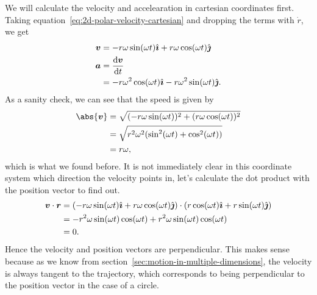 \documentclass[../classical_mechanics.tex]{subfiles}
\begin{document}
            We will calculate the velocity and accelearation in cartesian coordinates first.
            Taking equation~\ref{eq:2d-polar-velocity-cartesian} and dropping the terms with $\dot{r}$, we get
            \begin{align}
                \vec{v}&=-r\omega\sin(\omega t)\ihat+r\omega\cos(\omega t)\jhat\\
                \vec{a}&=\dv{\vec{v}}{t}\\
                &=-r\omega^2\cos(\omega t)\ihat-r\omega^2\sin(\omega t)\jhat.
            \end{align}
            As a sanity check, we can see that the speed is given by
            \begin{align}
                \abs{\vec{v}}&=\sqrt{(-r\omega\sin(\omega t))^2+(r\omega\cos(\omega t))^2}\\
                &=\sqrt{r^2\omega^2(\sin^2(\omega t)+\cos^2(\omega t))}\\
                &=r\omega,
            \end{align}
            which is what we found before.
            It is not immediately clear in this coordinate system which direction the velocity points in, let's calculate the dot product with the position vector to find out.
            \begin{align}
                \boldsymbol{v}\cdot\boldsymbol{r}&=(-r\omega\sin(\omega t)\hat{\boldsymbol{\imath}}+r\omega\cos(\omega t)\hat{\boldsymbol{\jmath}})\cdot(r\cos(\omega t)\hat{\boldsymbol{\imath}}+r\sin(\omega t)\hat{\boldsymbol{\jmath}})\\
                &=-r^2\omega\sin(\omega t)\cos(\omega t)+r^2\omega\sin(\omega t)\cos(\omega t)\\
                &=0.
            \end{align}
            Hence the velocity and position vectors are perpendicular.
            This makes sense because as we know from section~\ref{sec:motion-in-multiple-dimensions}, the velocity is always tangent to the trajectory, which corresponds to being perpendicular to the position vector in the case of a circle.
\end{document}
